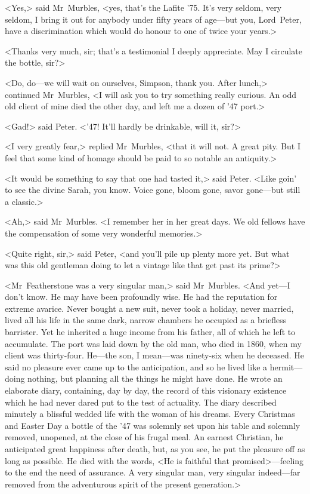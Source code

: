 <Yes,> said Mr~Murbles, <yes, that's the Lafite '75. It's very seldom, very seldom, I bring it out for anybody under fifty years of age—but you, Lord~Peter, have a discrimination which would do honour to one of twice your years.>

<Thanks very much, sir; that's a testimonial I deeply appreciate. May I circulate the bottle, sir?>

<Do, do—we will wait on ourselves, Simpson, thank you. After lunch,> continued Mr~Murbles, <I will ask you to try something really curious.  An odd old client of mine died the other day, and left me a dozen of '47 port.>

<Gad!> said Peter. <'47! It'll hardly be drinkable, will it, sir?>

<I very greatly fear,> replied Mr~Murbles, <that it will not. A great pity. But I feel that some kind of homage should be paid to so notable an antiquity.>

<It would be something to say that one had tasted it,> said Peter. <Like goin' to see the divine Sarah, you know. Voice gone, bloom gone, savor gone—but still a classic.>

<Ah,> said Mr~Murbles. <I remember her in her great days. We old fellows have the compensation of some very wonderful memories.>

<Quite right, sir,> said Peter, <and you'll pile up plenty more yet.  But what was this old gentleman doing to let a vintage like that get past its prime?>

<Mr~Featherstone was a very singular man,> said Mr~Murbles. <And yet—I don't know. He may have been profoundly wise. He had the reputation for extreme avarice. Never bought a new suit, never took a holiday, never married, lived all his life in the same dark, narrow chambers he occupied as a briefless barrister. Yet he inherited a huge income from his father, all of which he left to accumulate. The port was laid down by the old man, who died in 1860, when my client was thirty-four. He—the son, I mean—was ninety-six when he deceased. He said no pleasure ever came up to the anticipation, and so he lived like a hermit—doing nothing, but planning all the things he might have done. He wrote an elaborate diary, containing, day by day, the record of this visionary existence which he had never dared put to the test of actuality. The diary described minutely a blissful wedded life with the woman of his dreams. Every Christmas and Easter Day a bottle of the '47 was solemnly set upon his table and solemnly removed, unopened, at the close of his frugal meal. An earnest Christian, he anticipated great happiness after death, but, as you see, he put the pleasure off as long as possible. He died with the words, <He is faithful that promised>—feeling to the end the need of assurance. A very singular man, very singular indeed—far removed from the adventurous spirit of the present generation.>

